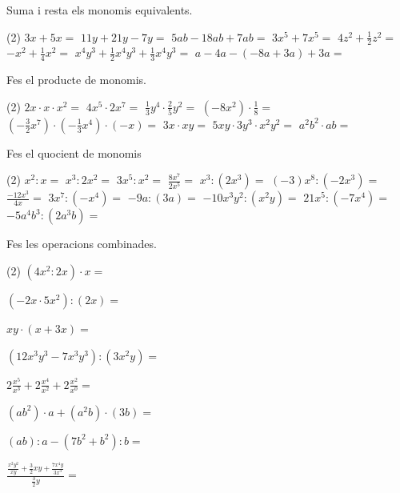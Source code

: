 \begin{mylist}

\exer \spen Suma i resta els monomis equivalents.
\begin{tasks}(2)
\task $3x+5x =$ 
\task $11y+21y-7y =$ 
\task $5ab-18ab+7ab=$ 
\task $3x^5+7x^5=$
\task $4z^2+\frac{1}{2}z^2=$
\task $-x^2+\frac{1}{4}x^2=$
\task $x^4y^3+ \frac{1}{2}x^4y^3+\frac{1}{3}x^4y^3=$
\task $a-4a-(-8a+3a)+3a=$
\end{tasks}


\exer \spen Fes el producte de monomis.
\begin{tasks}(2)
	\task $2x\cdot x \cdot x^2=$ 
	\task $4x^5\cdot 2x^7 =$ 
	\task $ \frac{1}{3}y^4 \cdot \frac{2}{5}y^2 =$
	\task $(-8x^2)\cdot \frac{1}{8}=$
	\task $(-\frac{3}{2}x^7)\cdot(-\frac{1}{3}x^4)\cdot (-x)=$
	\task $3x \cdot xy=$
	\task $5xy \cdot 3y^3 \cdot x^2y^2=$
	\task $a^2b^2 \cdot ab=$
\end{tasks}


\newpage
\exer \spen Fes el quocient de monomis
 \begin{tasks}(2)
	\task $x^2:x=$
\task $x^3:2x^2=$
\task $3x^5:x^2=$
\task $\frac{8x^7}{2x^5}=$
\task $x^3:(2x^3)=$
\task $(-3)x^8:(-2x^3)=$
\task $\frac{-12x^3}{4x}=$
\task $3x^7:(-x^4)=$
\task $-9a:(3a)=$
\task $-10x^3y^2:(x^2y)=$
\task $21x^5:(-7x^4)=$
\task $-5a^4b^3:(2a^3b)=$
\end{tasks}


\exer \spen Fes les operacions combinades. 
 \begin{tasks}(2)
	\task $(4x^2:2x)\cdot x=$
	
\task $(-2x\cdot 5x^2):(2x)=$

\task $xy\cdot (x+3x)=$

\task $(12 x^3y^3 -7x^3y^3): (3x^2y)=$

\task $2\frac{x^5}{x^3}+ 2 \frac{x^4}{x^2} + 2 \frac{x^2}{x^0}=$

\task $(ab^2)\cdot a + (a^2 b)\cdot (3b)=$

\task $(ab):a - (7b^2+b^2):b=$

\task $\frac{\frac{x^2y^2}{xy}+\frac{3}{2}xy+\frac{7x^4y}{3x^3}}{\frac{3}{2}y}=$
 \end{tasks}


\end{mylist}


